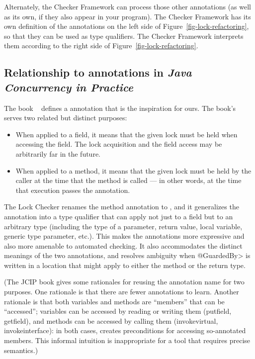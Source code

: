 Alternately, the Checker Framework can process those other annotations (as
well as its own, if they also appear in your program).  The Checker
Framework has its own definition of the annotations on the left side of
Figure~\ref{fig-lock-refactoring}, so that they can be used as type
qualifiers.  The Checker Framework interprets them according to the right
side of Figure~\ref{fig-lock-refactoring}.


\subsection{Relationship to annotations in \emph{Java Concurrency in Practice}\label{jcip-annotations}}

The book ~\cite{Goetz2006} defines a
 annotation that is the inspiration for ours.  The book's
 serves two related but distinct purposes:

\begin{itemize}
\item
  When applied to a field, it means that the given lock must be held when
  accessing the field.  The lock acquisition and the field access may be
  arbitrarily far in the future.
\item
  When applied to a method, it means that the given lock must be held by
  the caller at the time that the method is called --- in other words, at
  the time that execution passes the  annotation.
\end{itemize}

The Lock Checker renames the method annotation to
, and it generalizes the 
 annotation into a type qualifier
that can apply not just to a field but to an arbitrary type (including the
type of a parameter, return value, local variable, generic type parameter,
etc.).  This makes the annotations more expressive and also more amenable
to automated checking.  It also accommodates the distinct
meanings of the two annotations, and resolves ambiguity when \<@GuardedBy>
is written in a location that might apply to either the method or the
return type.

(The JCIP book gives some rationales for reusing the annotation name for
two purposes.  One rationale is
that there are fewer annotations to learn.  Another rationale is
that both variables and methods are ``members'' that can be ``accessed'';
variables can be accessed by reading or writing them (putfield, getfield),
and methods can be accessed by calling them (invokevirtual,
invokeinterface):  in both cases,  creates preconditions
for accessing so-annotated members.  This informal intuition is
inappropriate for a tool that requires precise semantics.)

